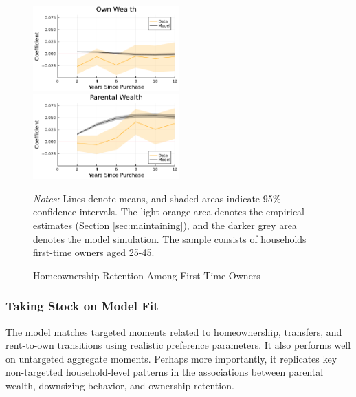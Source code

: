 \documentclass[12pt]{article}
\begin{document}
\begin{figure}[tb]
	\caption{Homeownership Retention Among First-Time Owners}\label{fig:remain_model}
	\includegraphics[width=0.5\textwidth]{../tabfig/model_remain_own.pdf}%
	\includegraphics[width=0.5\textwidth]{../tabfig/model_remain_parent.pdf}
	
	{\begin{footnotesize} \textit{Notes:} Lines denote means, and shaded areas indicate 95\% confidence intervals. The light orange area denotes the empirical estimates (Section \ref{sec:maintaining}), and the darker grey area denotes the model simulation. The sample consists of households first-time owners aged 25-45. \end{footnotesize}}
\end{figure}

\subsubsection{Taking Stock on Model Fit}
The model matches targeted moments related to homeownership, transfers, and rent-to-own transitions using realistic preference parameters. It also performs well on untargeted aggregate moments. Perhaps more importantly, it replicates key non-targetted household-level patterns in the associations between parental wealth, downsizing behavior, and ownership retention.
\end{document}

